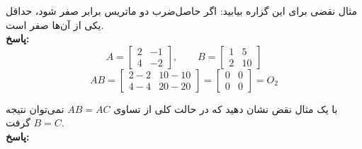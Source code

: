 \begin{example}
	مثال نقضی برای این گزاره بیابید: اگر حاصل‌ضرب دو ماتریس برابر صفر شود، حداقل یکی از آن‌ها صفر است. \\
	\textbf{پاسخ:}
	\[
	A=
	\begin{bmatrix}
		2 & -1 \\
		4 & -2
	\end{bmatrix},
	\qquad
	B=
	\begin{bmatrix}
		1 & 5 \\
		2 & 10
	\end{bmatrix}
	\]
	\[
	AB=
	\begin{bmatrix}
		2-2 & 10-10 \\
		4-4 & 20-20
	\end{bmatrix}
	=
	\begin{bmatrix}
		0 & 0 \\
		0 & 0
	\end{bmatrix}
	= O_2
	\]
\end{example}

\begin{example}
	با یک مثال نقض نشان دهید که در حالت کلی از تساوی
	$AB=AC$
	نمی‌توان نتیجه گرفت
	$B=C$.
	\\ \textbf{پاسخ:}
\end{example}

